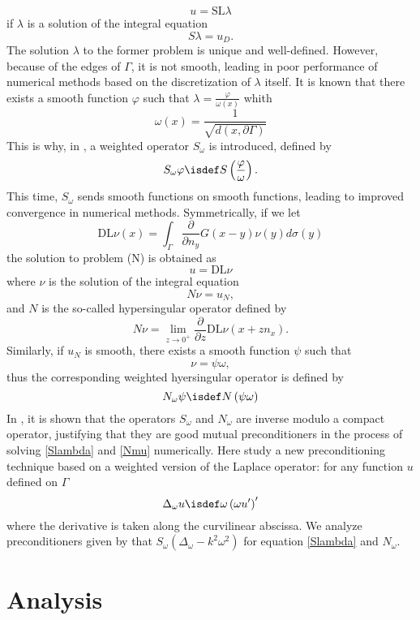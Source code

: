 \documentclass[]{article}
\begin{document}
\[ u = \text{SL} \lambda \]
if $\lambda$ is a solution of the integral equation 
\begin{equation}
	S \lambda = u_D.
	\label{Slambda}
\end{equation} 
The solution $\lambda$ to the former problem is unique and well-defined. However, because of the edges of $\Gamma$, it is not smooth, leading in poor performance of numerical methods based on the discretization of $\lambda$ itself. It is known that there exists a smooth function $\varphi$ such that $ \lambda = \frac{\varphi}{\omega(x)}$ whith 
\[\omega(x) = \dfrac{1}{\sqrt{d(x,\partial \Gamma)}}\]
This is why, in \cite{bruno2012second}, a weighted operator $S_{\omega}$ is introduced, defined by 
\[S_{\omega} \varphi \isdef S \left(\dfrac{\varphi}{\omega}\right).\]
This time, $S_\omega$ sends smooth functions on smooth functions, leading to improved convergence in numerical methods. 
Symmetrically, if we let 
\begin{equation}
\text{DL}\nu(x) = \int_{\Gamma}\dfrac{\partial}{\partial n_y} G(x-y)\nu(y)d\sigma(y)
\end{equation}
the solution to problem (N) is obtained as 
\[u = \text{DL}\nu\] where $\nu$ is the solution of the integral equation
\begin{equation}
N \nu = u_N,
	\label{Nmu}
\end{equation}
and $N$ is the so-called hypersingular operator defined by 
\[N\nu = \lim_{z \to 0^+}\dfrac{\partial}{\partial z}\text{DL}\nu(x + z n_x).\]
Similarly, if $u_N$ is smooth, there exists a smooth function $\psi$ such that 
\[\nu = \psi\omega,\]
thus the corresponding weighted hyersingular operator is defined by 
\[N_{\omega}\psi \isdef N\left(\psi \omega\right)\]
In \cite{bruno2012second}, it is shown that the operators $S_{\omega}$ and $N_{\omega}$ are inverse modulo a compact operator, justifying that they are good mutual preconditioners in the process of solving \eqref{Slambda} and \eqref{Nmu} numerically. 
Here study a new preconditioning technique based on a weighted version of the Laplace operator: for any function $u$ defined on $\Gamma$
\[\Delta_{\omega}u \isdef \omega\left(\omega u'\right)'\]
where the derivative is taken along the curvilinear abscissa. We analyze preconditioners given by that $S_\omega (\Delta_\omega - k^2 \omega^2)$ for equation \eqref{Slambda} and $N_{\omega}$.
\section{Analysis }
\end{document}
